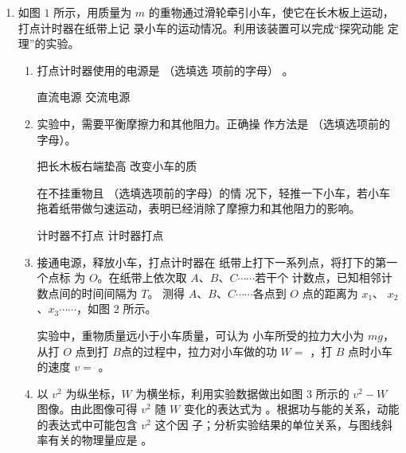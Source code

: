 \begin{enumerate}
\newpage
\item 
{}
如图 $ 1 $ 所示，用质量为 $ m $ 的重物通过滑轮牵引小车，使它在长木板上运动，打点计时器在纸带上记
录小车的运动情况。利用该装置可以完成“探究动能
定理”的实验。
\begin{figure}[h!]
\centering
 \qquad 
  
\end{figure}

\begin{enumerate}
\renewcommand{\labelenumi}{\arabic{enumi}.}
\item
打点计时器使用的电源是
（选填选
项前的字母）
。


\twochoices
{直流电源}
{交流电源}

\item 

实验中，需要平衡摩擦力和其他阻力。正确操
作方法是
（选填选项前的字母）。

\twochoices
{把长木板右端垫高}
{改变小车的质}



在不挂重物且
（选填选项前的字母）的情
况下，轻推一下小车，若小车拖着纸带做匀速运动，表明已经消除了摩擦力和其他阻力的影响。

\twochoices
{计时器不打点}
{计时器打点}


\item 
接通电源，释放小车，打点计时器在
纸带上打下一系列点，将打下的第一个点标
为 $ O $。在纸带上依次取 $ A $、$ B $、$ C \cdots \cdots $若干个
计数点，已知相邻计数点间的时间间隔为 $ T $。
测得 $ A $、$ B $、$ C \cdots \cdots $各点到 $ O $ 点的距离为 $ x_{1} $、
$ x_{2} $、$ x_{3} \cdots \cdots $，如图 $ 2 $ 所示。



实验中，重物质量远小于小车质量，可认为
小车所受的拉力大小为 $ mg $，从打 $ O $ 点到打
$ B $点的过程中，拉力对小车做的功
$ W= $
，打 $ B $ 点时小车的速度 $ v= $
。



\item 
以 $ v^{2} $ 为纵坐标，$ W $ 为横坐标，利用实验数据做出如图 $ 3 $ 所示的 $ v^{2} - W $ 图像。由此图像可得 $ v^{2} $
随 $ W $ 变化的表达式为  。根据功与能的关系，动能的表达式中可能包含 $ v^{2} $ 这个因
子；分析实验结果的单位关系，与图线斜率有关的物理量应是  。



\end{enumerate}
\end{enumerate}
